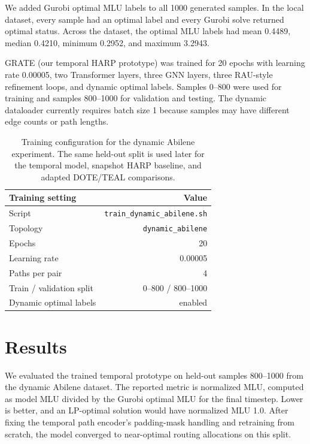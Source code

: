 \documentclass[letterpaper,twocolumn,10pt]{article}
\begin{document}
We added Gurobi optimal MLU labels to all 1000 generated samples. In the local dataset, every sample had an optimal label and every Gurobi solve returned optimal status. Across the dataset, the optimal MLU labels had mean 0.4489, median 0.4210, minimum 0.2952, and maximum 3.2943.

GRATE (our temporal HARP prototype) was trained for 20 epochs with learning rate 0.00005, two Transformer layers, three GNN layers, three RAU-style refinement loops, and dynamic optimal labels. Samples 0--800 were used for training and samples 800--1000 for validation and testing. The dynamic dataloader currently requires batch size 1 because samples may have different edge counts or path lengths.

\begin{table}[t]
\centering
\small
\begin{tabular}{lr}
\hline
Training setting & Value \\
\hline
Script & \texttt{train\_dynamic\_abilene.sh} \\
Topology & \texttt{dynamic\_abilene} \\
Epochs & 20 \\
Learning rate & 0.00005 \\
Paths per pair & 4 \\
Train / validation split & 0--800 / 800--1000 \\
Dynamic optimal labels & enabled \\
\hline
\end{tabular}
\caption{Training configuration for the dynamic Abilene experiment. The same held-out split is used later for the temporal model, snapshot HARP baseline, and adapted DOTE/TEAL comparisons.}
\label{tab:training-configuration}
\end{table}

\section{Results}

We evaluated the trained temporal prototype on held-out samples 800--1000 from the dynamic Abilene dataset. The reported metric is normalized MLU, computed as model MLU divided by the Gurobi optimal MLU for the final timestep. Lower is better, and an LP-optimal solution would have normalized MLU 1.0. After fixing the temporal path encoder's padding-mask handling and retraining from scratch, the model converged to near-optimal routing allocations on this split.
\end{document}
